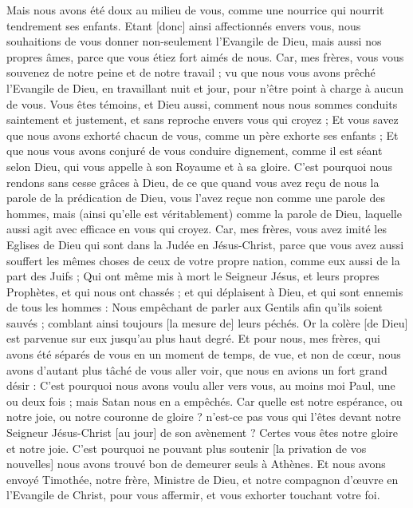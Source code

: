 \begin{multicols}{2}
Mais nous avons été doux au milieu de vous, comme une nourrice qui nourrit tendrement ses enfants.
Etant [donc] ainsi affectionnés envers vous, nous souhaitions de vous donner non-seulement l'Evangile de Dieu, mais aussi nos propres âmes, parce que vous étiez fort aimés de nous.
Car, mes frères, vous vous souvenez de notre peine et de notre travail ; vu que nous vous avons prêché l'Evangile de Dieu, en travaillant nuit et jour, pour n'être point à charge à aucun de vous.
Vous êtes témoins, et Dieu aussi, comment nous nous sommes conduits saintement et justement, et sans reproche envers vous qui croyez ;
Et vous savez que nous avons exhorté chacun de vous, comme un père exhorte ses enfants ;
Et que nous vous avons conjuré de vous conduire dignement, comme il est séant selon Dieu, qui vous appelle à son Royaume et à sa gloire.
C'est pourquoi nous rendons sans cesse grâces à Dieu, de ce que quand vous avez reçu de nous la parole de la prédication de Dieu, vous l'avez reçue non comme une parole des hommes, mais (ainsi qu'elle est véritablement) comme la parole de Dieu, laquelle aussi agit avec efficace en vous qui croyez.
Car, mes frères, vous avez imité les Eglises de Dieu qui sont dans la Judée en Jésus-Christ, parce que vous avez aussi souffert les mêmes choses de ceux de votre propre nation, comme eux aussi de la part des Juifs ;
Qui ont même mis à mort le Seigneur Jésus, et leurs propres Prophètes, et qui nous ont chassés ; et qui déplaisent à Dieu, et qui sont ennemis de tous les hommes :
Nous empêchant de parler aux Gentils afin qu'ils soient sauvés ; comblant ainsi toujours [la mesure de] leurs péchés. Or la colère [de Dieu] est parvenue sur eux jusqu'au plus haut degré.
Et pour nous, mes frères, qui avons été séparés de vous en un moment de temps, de vue, et non de cœur, nous avons d'autant plus tâché de vous aller voir, que nous en avions un fort grand désir :
C'est pourquoi nous avons voulu aller vers vous, au moins moi Paul, une ou deux fois ; mais Satan nous en a empêchés.
Car quelle est notre espérance, ou notre joie, ou notre couronne de gloire ? n'est-ce pas vous qui l'êtes devant notre Seigneur Jésus-Christ [au jour] de son avènement ?
Certes vous êtes notre gloire et notre joie.
\VerseOne{}C'est pourquoi ne pouvant plus soutenir [la privation de vos nouvelles] nous avons trouvé bon de demeurer seuls à Athènes.
Et nous avons envoyé Timothée, notre frère, Ministre de Dieu, et notre compagnon d'œuvre en l'Evangile de Christ, pour vous affermir, et vous exhorter touchant votre foi.

\end{multicols}
